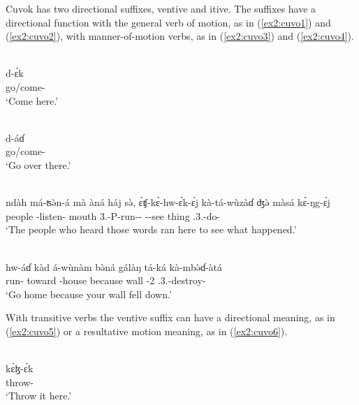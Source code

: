 Cuvok has two directional suffixes, ventive and itive. The suffixes have a directional function with the general verb of motion, as in (\ref{ex2:cuvo1}) and (\ref{ex2:cuvo2}), with manner-of-motion verbs, as in (\ref{ex2:cuvo3}) and (\ref{ex2:cuvo4}).

\ea\label{ex2:cuvo1}
 \\
\gll d-ɛ́k	\\
go/come- \\
\glt `Come here.'

\ex\label{ex2:cuvo2}
 \\
\gll  d-áɗ \\
go/come- \\
\glt `Go over there.'

\ex\label{ex2:cuvo3}
 \\
\gll ndàh	má-ʦə̀n-á	mà	àná	háj	sə̀, ɛ̀ʧ-kɛ̀-hw-ɛ́k-ɛ́j	kà-tá-wùzàɗ	ʤə̀	màsá	kɛ̀-ŋg-ɛ́j \\
people	-listen-	mouth			 3.-P-run--	--see	thing		.3.-do- \\
\glt `The people who heard those words ran here to see what happened.'

\ex\label{ex2:cuvo4}
 \\
\gll hw-áɗ	kàd	á-wùnàm	bə̀ná	gálàŋ	tá-ká	kà-mbə̀ɗ-àtá \\
run-	toward	-house	because	wall	-2	.3.-destroy- \\
\glt `Go home because your wall fell down.'
\z 

With transitive verbs the ventive suffix can have a directional meaning, as in (\ref{ex2:cuvo5}) or a resultative motion meaning, as in (\ref{ex2:cuvo6}).

\ea\label{ex2:cuvo5}
 \\
\gll kɛ̀ɮ-ɛ́k \\
throw- \\
\glt `Throw it here.'

